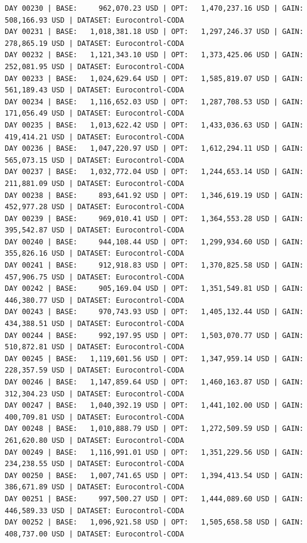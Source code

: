 \documentclass[11pt,a4paper]{article}
\begin{document}
\begin{verbatim}
DAY 00230 | BASE:     962,070.23 USD | OPT:   1,470,237.16 USD | GAIN: 508,166.93 USD | DATASET: Eurocontrol-CODA
DAY 00231 | BASE:   1,018,381.18 USD | OPT:   1,297,246.37 USD | GAIN: 278,865.19 USD | DATASET: Eurocontrol-CODA
DAY 00232 | BASE:   1,121,343.10 USD | OPT:   1,373,425.06 USD | GAIN: 252,081.95 USD | DATASET: Eurocontrol-CODA
DAY 00233 | BASE:   1,024,629.64 USD | OPT:   1,585,819.07 USD | GAIN: 561,189.43 USD | DATASET: Eurocontrol-CODA
DAY 00234 | BASE:   1,116,652.03 USD | OPT:   1,287,708.53 USD | GAIN: 171,056.49 USD | DATASET: Eurocontrol-CODA
DAY 00235 | BASE:   1,013,622.42 USD | OPT:   1,433,036.63 USD | GAIN: 419,414.21 USD | DATASET: Eurocontrol-CODA
DAY 00236 | BASE:   1,047,220.97 USD | OPT:   1,612,294.11 USD | GAIN: 565,073.15 USD | DATASET: Eurocontrol-CODA
DAY 00237 | BASE:   1,032,772.04 USD | OPT:   1,244,653.14 USD | GAIN: 211,881.09 USD | DATASET: Eurocontrol-CODA
DAY 00238 | BASE:     893,641.92 USD | OPT:   1,346,619.19 USD | GAIN: 452,977.28 USD | DATASET: Eurocontrol-CODA
DAY 00239 | BASE:     969,010.41 USD | OPT:   1,364,553.28 USD | GAIN: 395,542.87 USD | DATASET: Eurocontrol-CODA
DAY 00240 | BASE:     944,108.44 USD | OPT:   1,299,934.60 USD | GAIN: 355,826.16 USD | DATASET: Eurocontrol-CODA
DAY 00241 | BASE:     912,918.83 USD | OPT:   1,370,825.58 USD | GAIN: 457,906.75 USD | DATASET: Eurocontrol-CODA
DAY 00242 | BASE:     905,169.04 USD | OPT:   1,351,549.81 USD | GAIN: 446,380.77 USD | DATASET: Eurocontrol-CODA
DAY 00243 | BASE:     970,743.93 USD | OPT:   1,405,132.44 USD | GAIN: 434,388.51 USD | DATASET: Eurocontrol-CODA
DAY 00244 | BASE:     992,197.95 USD | OPT:   1,503,070.77 USD | GAIN: 510,872.81 USD | DATASET: Eurocontrol-CODA
DAY 00245 | BASE:   1,119,601.56 USD | OPT:   1,347,959.14 USD | GAIN: 228,357.59 USD | DATASET: Eurocontrol-CODA
DAY 00246 | BASE:   1,147,859.64 USD | OPT:   1,460,163.87 USD | GAIN: 312,304.23 USD | DATASET: Eurocontrol-CODA
DAY 00247 | BASE:   1,040,392.19 USD | OPT:   1,441,102.00 USD | GAIN: 400,709.81 USD | DATASET: Eurocontrol-CODA
DAY 00248 | BASE:   1,010,888.79 USD | OPT:   1,272,509.59 USD | GAIN: 261,620.80 USD | DATASET: Eurocontrol-CODA
DAY 00249 | BASE:   1,116,991.01 USD | OPT:   1,351,229.56 USD | GAIN: 234,238.55 USD | DATASET: Eurocontrol-CODA
DAY 00250 | BASE:   1,007,741.65 USD | OPT:   1,394,413.54 USD | GAIN: 386,671.89 USD | DATASET: Eurocontrol-CODA
DAY 00251 | BASE:     997,500.27 USD | OPT:   1,444,089.60 USD | GAIN: 446,589.33 USD | DATASET: Eurocontrol-CODA
DAY 00252 | BASE:   1,096,921.58 USD | OPT:   1,505,658.58 USD | GAIN: 408,737.00 USD | DATASET: Eurocontrol-CODA

\end{verbatim}
\end{document}
